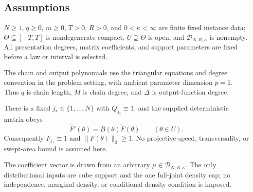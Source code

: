 \subsection{Assumptions}\label{sec:assumptions}
\begin{assumption}\label{assump:parameter-regime}
$N\geq1$, $q\geq0$, $m\geq0$, $T>0$, $R>0$, and $0<\kappa<\infty$ are finite fixed instance data;
$\Theta\subseteq[-T,T]$ is nondegenerate compact, $U\supseteq\Theta$ is open, and
$\mathcal D_{N,R,\kappa}$ is nonempty. All presentation degrees, matrix coefficients, and support parameters
are fixed before a law or interval is selected.
\end{assumption}

\begin{assumption}\label{assump:balcan-common-chain}
The chain and output polynomials use the triangular equations and degree convention in the problem setting, with ambient
parameter dimension $p=1$. Thus $q$ is chain length, $M$ is chain degree, and $\Delta$ is output-function degree.
\end{assumption}

\begin{assumption}\label{assump:anchored-derivative-closure}
There is a fixed $j_*\in\{1,\ldots,N\}$ with $Q_{j_*}\equiv1$, and the supplied deterministic matrix obeys
\begin{equation}
\label{eq:setup-display-012}
\widetilde F'(\theta)=B(\theta)\widetilde F(\theta)\qquad(\theta\in U).
\end{equation}
Consequently $F_{j_*}\equiv1$ and $\|F(\theta)\|_2\geq1$. No projective-speed, transversality, or
swept-area bound is assumed here.
\end{assumption}

\begin{assumption}\label{assump:cube-density-laws}
The coefficient vector is drawn from an arbitrary $\mu\in\mathcal D_{N,R,\kappa}$. The only distributional
inputs are cube support and the one full-joint density cap; no independence, marginal-density, or
conditional-density condition is imposed.
\end{assumption}

